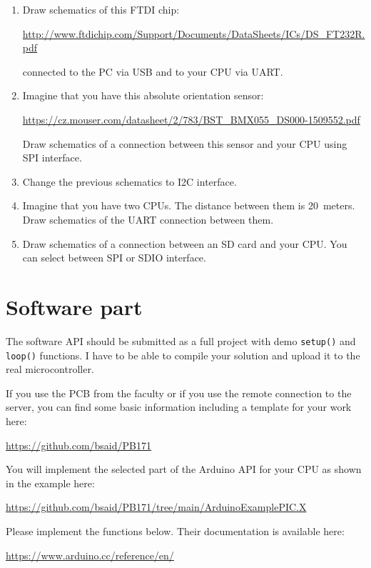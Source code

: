 \documentclass[12pt, a4paper]{article}
\begin{document}
\begin{enumerate}[resume]
	\item Draw schematics of this FTDI chip:
	
	{\footnotesize\url{http://www.ftdichip.com/Support/Documents/DataSheets/ICs/DS_FT232R.pdf}}
	
	connected to the PC via USB and to your CPU via UART.
	
	\item Imagine that you have this absolute orientation sensor:
	
	{\footnotesize\url{https://cz.mouser.com/datasheet/2/783/BST_BMX055_DS000-1509552.pdf}}
	
	Draw schematics of a connection between this sensor and your CPU using SPI interface.
	
	\item Change the previous schematics to I2C interface.
	
	\item Imagine that you have two CPUs. The distance between them is \SI{20}{meters}. Draw schematics of the UART connection between them.
	
	\item Draw schematics of a connection between an SD card and your CPU. You can select between SPI or SDIO interface.
\end{enumerate}

\section{Software part}
The software API should be submitted as a full project with demo \texttt{setup()} and \texttt{loop()} functions. I have to be able to compile your solution and upload it to the real microcontroller.

If you use the PCB from the faculty or if you use the remote connection to the server, you can find some basic information including a template for your work here:

\url{https://github.com/bsaid/PB171}

You will implement the selected part of the Arduino API for your CPU as shown in the example here:

\url{https://github.com/bsaid/PB171/tree/main/ArduinoExamplePIC.X}

Please implement the functions below. Their documentation is available here:

\url{https://www.arduino.cc/reference/en/}
\end{document}
